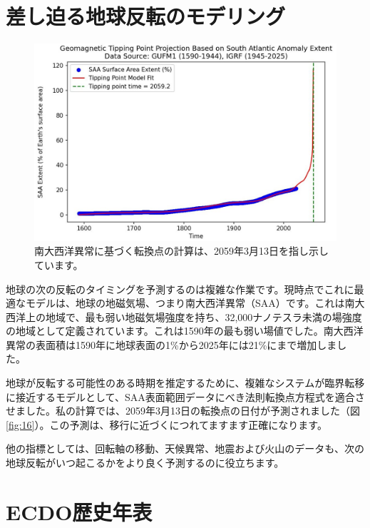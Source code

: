 \documentclass[10pt,twocolumn,letterpaper]{article}
\begin{document}
\section{差し迫る地球反転のモデリング}

\begin{figure}[b]
\begin{center}
   \includegraphics[width=1\linewidth]{saa-crop.jpeg}
\end{center}
   \caption{南大西洋異常に基づく転換点の計算は、2059年3月13日を指し示しています\cite{125,126}。}
\label{fig:16}
\label{fig:onecol}
\end{figure}

地球の次の反転のタイミングを予測するのは複雑な作業です。現時点でこれに最適なモデルは、地球の地磁気場、つまり南大西洋異常（SAA）です。これは南大西洋上の地域で、最も弱い地磁気場強度を持ち、32,000ナノテスラ未満の場強度の地域として定義されています\cite{135}。これは1590年の最も弱い場値でした。南大西洋異常の表面積は1590年に地球表面の1\%から2025年には21\%にまで増加しました\cite{136}。

地球が反転する可能性のある時期を推定するために、複雑なシステムが臨界転移に接近するモデルとして、SAA表面範囲データにべき法則転換点方程式を適合させました。私の計算では、2059年3月13日の転換点の日付が予測されました（図\ref{fig:16}）。この予測は、移行に近づくにつれてますます正確になります\cite{136}。

他の指標としては、回転軸の移動、天候異常、地震および火山のデータも、次の地球反転がいつ起こるかをより良く予測するのに役立ちます。

\section{ECDO歴史年表}
\end{document}
